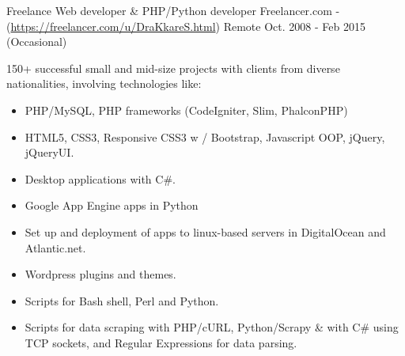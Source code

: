 \begin{cventries}

\cventry
{Freelance Web developer \& PHP/Python developer} %
{Freelancer.com - (\href{https://freelancer.com/u/DraKkareS.html}{https://freelancer.com/u/DraKkareS.html})} %
{Remote} %
{Oct. 2008 - Feb 2015 (Occasional)} %
{ %
	\begin{cvitems}
		\item {150+ successful small and mid-size projects with clients from diverse nationalities, involving technologies like:
		\begin{itemize}
			\item {PHP/MySQL, PHP frameworks (CodeIgniter, Slim, PhalconPHP)}
			\item {HTML5, CSS3, Responsive CSS3 w / Bootstrap, Javascript OOP, jQuery, jQueryUI.}
			\item {Desktop applications with C\#.}
			\item {Google App Engine apps in Python}
			\item {Set up and deployment of apps to linux-based servers in DigitalOcean and Atlantic.net.}
			\item {Wordpress plugins and themes.}
			\item {Scripts for Bash shell, Perl and Python.}
			\item {Scripts for data scraping with PHP/cURL, Python/Scrapy \& with C\# using TCP sockets, and Regular Expressions for data parsing.}
		\end{itemize}	
	}	
	\end{cvitems}
}


\end{cventries}